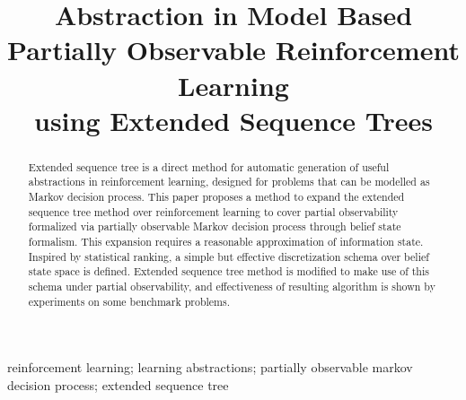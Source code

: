 \documentclass[10pt, conference, compsocconf]{IEEEtran}
\begin{document}
%
\title{Abstraction in Model Based Partially Observable Reinforcement Learning \\
using Extended Sequence Trees}



\author{
\and
{}
}


\maketitle

\begin{abstract}
Extended sequence tree is a direct method for automatic generation of useful abstractions in reinforcement learning, designed for problems that can be modelled as Markov decision process. This paper proposes a method to expand the extended sequence tree method over reinforcement learning to cover partial observability formalized via partially observable Markov decision process through belief state formalism. This expansion requires a reasonable approximation of information state. Inspired by statistical ranking, a simple but effective discretization schema over belief state space is defined. Extended sequence tree method is modified to make use of this schema under partial observability, and effectiveness of resulting algorithm is shown by experiments on some benchmark problems.
\end{abstract}

\begin{IEEEkeywords}
reinforcement learning; learning abstractions; partially observable markov decision process; extended sequence tree
\end{IEEEkeywords}
\end{document}
